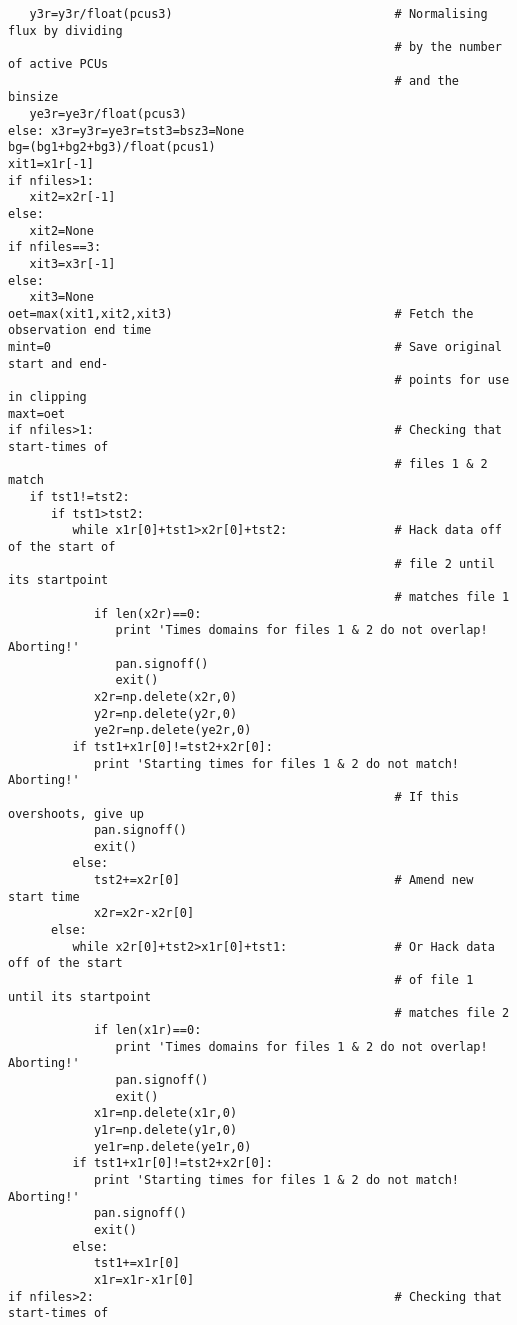 \begin{verbatim}
   y3r=y3r/float(pcus3)                               # Normalising flux by dividing
                                                      # by the number of active PCUs
                                                      # and the binsize
   ye3r=ye3r/float(pcus3)                             
else: x3r=y3r=ye3r=tst3=bsz3=None
bg=(bg1+bg2+bg3)/float(pcus1)
xit1=x1r[-1]
if nfiles>1:
   xit2=x2r[-1]
else:
   xit2=None
if nfiles==3:
   xit3=x3r[-1]
else:
   xit3=None
oet=max(xit1,xit2,xit3)                               # Fetch the observation end time
mint=0                                                # Save original start and end-
                                                      # points for use in clipping
maxt=oet
if nfiles>1:                                          # Checking that start-times of
                                                      # files 1 & 2 match
   if tst1!=tst2:
      if tst1>tst2:
         while x1r[0]+tst1>x2r[0]+tst2:               # Hack data off of the start of
                                                      # file 2 until its startpoint
                                                      # matches file 1
            if len(x2r)==0:
               print 'Times domains for files 1 & 2 do not overlap!  Aborting!'
               pan.signoff()
               exit()
            x2r=np.delete(x2r,0)
            y2r=np.delete(y2r,0)
            ye2r=np.delete(ye2r,0)
         if tst1+x1r[0]!=tst2+x2r[0]:
            print 'Starting times for files 1 & 2 do not match!  Aborting!'
                                                      # If this overshoots, give up
            pan.signoff()
            exit()
         else:
            tst2+=x2r[0]                              # Amend new start time
            x2r=x2r-x2r[0]
      else:
         while x2r[0]+tst2>x1r[0]+tst1:               # Or Hack data off of the start
                                                      # of file 1 until its startpoint
                                                      # matches file 2
            if len(x1r)==0:
               print 'Times domains for files 1 & 2 do not overlap!  Aborting!'
               pan.signoff()
               exit()
            x1r=np.delete(x1r,0)
            y1r=np.delete(y1r,0)
            ye1r=np.delete(ye1r,0)
         if tst1+x1r[0]!=tst2+x2r[0]:
            print 'Starting times for files 1 & 2 do not match!  Aborting!'
            pan.signoff()
            exit()
         else:
            tst1+=x1r[0]
            x1r=x1r-x1r[0]
if nfiles>2:                                          # Checking that start-times of

\end{verbatim}
